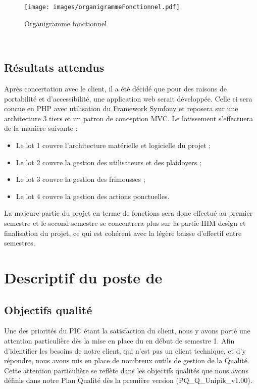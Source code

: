 \documentclass[asi]{picInsa}
\begin{document}
\begin{figure}[H]
	\texttt{[image: images/organigrammeFonctionnel.pdf]}
	\caption{Organigramme fonctionnel}
	\label{organigramme}
\end{figure}
~\\


\section{Résultats attendus}
Après concertation avec le client, il a été décidé que pour des raisons de portabilité et d'accessibilité, une application web serait développée. Celle ci sera concue en PHP avec utilisation du Framework Symfony et reposera sur une architecture 3 tiers et un patron de conception MVC. Le lotissement s’effectuera de la manière suivante :
\begin{itemize}
\item Le lot 1 couvre l'architecture matérielle et logicielle du projet ;
\item Le lot 2 couvre la gestion des utilisateurs et des plaidoyers ;
\item Le lot 3 couvre la gestion des frimousses ;
\item Le lot 4 couvre la gestion des actions ponctuelles.
\end{itemize}

La majeure partie du projet en terme de fonctions sera donc effectué au premier semestre et le second semestre se concentrera plus sur la partie IHM design et finalisation du projet, ce qui est cohérent avec la légère baisse d’effectif entre semestres.

\chapter{Descriptif du poste de \RQ}
\label{Descriptif}
\section{Objectifs qualité}
Une des priorités du PIC étant la satisfaction du client, nous y avons porté une attention particulière dès la mise en place du \SMQ{} en début de semestre 1. Afin d’identifier les besoins de notre client, qui n'est pas un client technique, et d'y répondre, nous avons mis en place de nombreux outils de gestion de la Qualité. Cette attention particulière se reflète dans les objectifs qualités que nous avons définis dans notre Plan Qualité dès la première version (PQ_Q_Unipik_v1.00).
\end{document}
